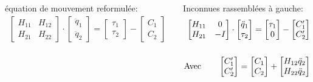 \documentclass[10pt]{beamer}
\begin{document}
\begin{frame}
	\begin{columns}[T]
	\begin{column}{.5\textwidth}\footnotesize
	\begin{alertblock}{équation de mouvement reformulée:}
	  \begin{align}
	  	\begin{bmatrix}
		  H_{11} & H_{12} \\
		  H_{21} & H_{22}
		\end{bmatrix} 
		\cdot
		\begin{bmatrix}
		  \ddot{q}_{1} \\
		  \ddot{q}_{2}
		\end{bmatrix} 
		= 
		\begin{bmatrix}
		  \tau_{1} \\
		  \tau_{2}
		\end{bmatrix} 
		-
		\begin{bmatrix}
		  C_{1} \\
		  C_{2}
		\end{bmatrix} \label{equ_local_eqMvt_2}
		\end{align}
	\end{alertblock}
	\end{column}

	\begin{column}{.5\textwidth}\footnotesize
	\begin{alertblock}{Inconnues rassemblées à gauche:}
		\begin{align}
		\begin{bmatrix}
		  H_{11} & 0 \\
		  H_{21} &  -I
		\end{bmatrix} 
		\cdot
		\begin{bmatrix}
		  \ddot{q}_1 \\
		  \tau_2
		\end{bmatrix} 
		=
		\begin{bmatrix}
		  \tau_1 \\
		  0
		\end{bmatrix} 
		-
		\begin{bmatrix}
		  C'_{1} \\
		  C'_{2}
		\end{bmatrix} \label{equ_equationMvt_dynHyb2} \\
		\notag \\
		\textnormal{Avec} \qquad
		\begin{bmatrix}
		  C'_{1} \\
		  C'_{2}
		\end{bmatrix}
		=
		\begin{bmatrix}
		  C_{1} \\
		  C_{2}
		\end{bmatrix}
		+
		\begin{bmatrix}
		  H_{12} \ddot{q}_2 \\
		  H_{22} \ddot{q}_2
		\end{bmatrix} \label{equ_cPrime}
		\end{align}
	\end{alertblock}
	\end{column}
	\end{columns}
  
\end{frame}
\end{document}
